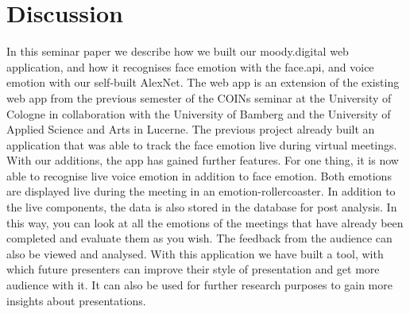 \section{Discussion}
\label{sec:Discussion}
In this seminar paper we describe how we built our moody.digital web application, and how it recognises face emotion with the face.api, and voice emotion with our self-built AlexNet. The web app is an extension of the existing web app from the previous semester of the COINs seminar at the University of Cologne in collaboration with the University of Bamberg and the University of Applied Science and Arts in Lucerne. The previous project already built an application that was able to track the face emotion live during virtual meetings. With our additions, the app has gained further features. For one thing, it is now able to recognise live voice emotion in addition to face emotion. Both emotions are displayed live during the meeting in an emotion-rollercoaster. In addition to the live components, the data is also stored in the database for post analysis. In this way, you can look at all the emotions of the meetings that have already been completed and evaluate them as you wish. The feedback from the audience can also be viewed and analysed. 
With this application we have built a tool, with which future presenters can improve their style of presentation and get more audience with it. It can also be used for further research purposes to gain more insights about presentations.
